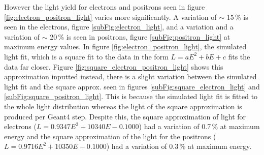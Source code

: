However the light yield for electrons and positrons seen in figure \ref{fig:electron_positron_light} varies more significantly. A variation of $\sim$ 15\,\% is seen in the electrons, figure \ref{subFig:electron_light}, and a variation and a variation of $\sim$ 20\,\% is seen in positrons, figure \ref{subFig:positron_light} at maximum energy values. In figure \ref{fig:electron_positron_light}, the simulated light fit, which is a square fit to the data in the form $L = aE^2 + bE+ c$ fits the data far closer. Figure \ref{fig:square_electron_positron_light} shows this approximation inputted instead, there is a slight variation between the simulated light fit and the square approx. seen in figures \ref{subFig:square_electron_light} and \ref{subFig:square_positron_light}. This is because the simulated light fit is fitted to the whole light distribution whereas the light of the square approximation is produced per Geant4 step. Despite this, the square approximation of light for electrons ($L = 0.9347E^2 + 10340E - 0.1000$) had a variation of 0.7\,\% at maximum energy and the square approximation of the light for the positrons ($L = 0.9716E^2 + 10350E -0.1000$) had a variation of 0.3\,\% at maximum energy. 
